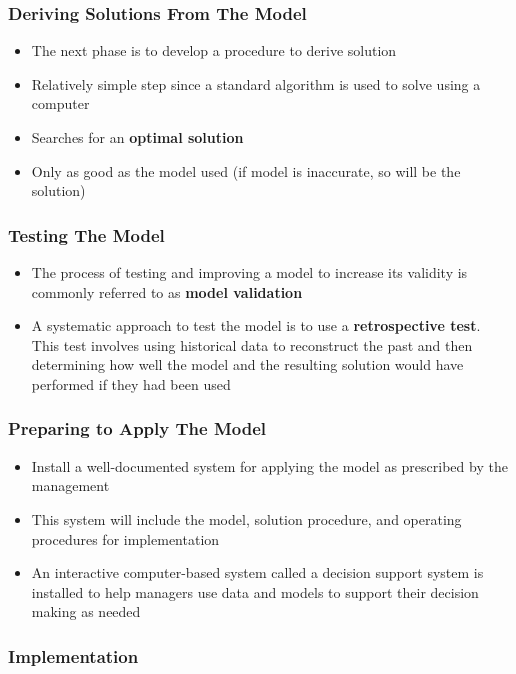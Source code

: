 \documentclass[12pt]{article}
\begin{document}
\subsubsection*{Deriving Solutions From The Model}

\begin{itemize}
\item The next phase is to develop a procedure to derive solution
\item Relatively simple step since a standard algorithm is used to solve using a computer
\item Searches for an \textbf{optimal solution}
\item Only as good as the model used (if model is inaccurate, so will be the solution)
\end{itemize}

\subsubsection*{Testing The Model}

\begin{itemize}
\item The process of testing and improving a model to increase its validity is commonly referred to as \textbf{model validation}
\item A systematic approach to test the model is to use a \textbf{retrospective test}. This test involves using historical data to reconstruct the past and then determining how well the model and the resulting solution would have performed if they had been used
\end{itemize}

\subsubsection*{Preparing to Apply The Model}

\begin{itemize}
\item Install a well-documented system for applying the model as prescribed by the management
\item This system will include the model, solution procedure, and operating procedures for implementation
\item An interactive computer-based system called a decision support system is installed to help managers use data and models to support their decision making as needed
\end{itemize}

\subsubsection*{Implementation}
\end{document}
